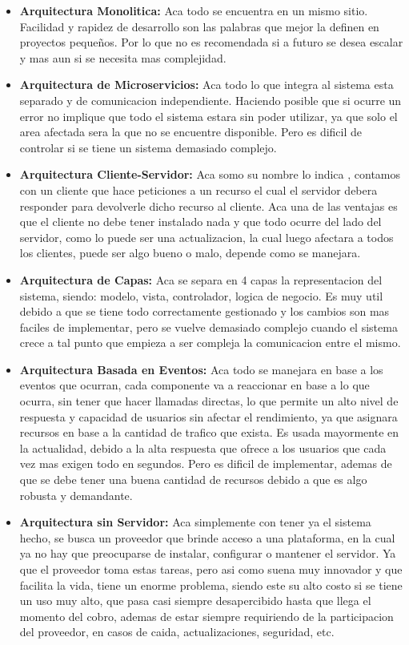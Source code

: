 \documentclass[12pt]{article}
\begin{document}
\begin{itemize}
    \item\textbf{Arquitectura Monolitica:} Aca todo se encuentra en un mismo sitio. Facilidad y rapidez de desarrollo son las palabras que mejor la definen en proyectos pequeños. Por lo que no es recomendada si a futuro se desea escalar y mas aun si se necesita mas complejidad.
    
    \item \textbf{Arquitectura de Microservicios:} Aca todo lo que integra al sistema esta separado y de comunicacion independiente. Haciendo posible que si ocurre un error no implique que todo el sistema estara sin poder utilizar, ya que solo el area afectada sera la que no se encuentre disponible. Pero es dificil de controlar si se tiene un sistema demasiado complejo.
    \item\textbf{Arquitectura Cliente-Servidor:} Aca somo su nombre lo indica , contamos con un cliente que hace peticiones a un recurso el cual el servidor debera responder para devolverle dicho recurso al cliente. Aca una de las ventajas es que el cliente no debe tener instalado nada y que todo ocurre del lado del servidor, como lo puede ser una actualizacion, la cual luego afectara a todos los clientes, puede ser algo bueno o malo, depende como se manejara.
    \item\textbf{Arquitectura de Capas:} Aca se separa en 4 capas la representacion del sistema, siendo: modelo, vista, controlador, logica de negocio. Es muy util debido a que se tiene todo correctamente gestionado y los cambios son mas faciles de implementar, pero se vuelve demasiado complejo cuando el sistema crece a tal punto que empieza a ser compleja la comunicacion entre el mismo.
    \item\textbf{Arquitectura Basada en Eventos:} Aca todo se manejara en base a los eventos que ocurran, cada componente va a reaccionar en base a lo que ocurra, sin tener que hacer llamadas directas, lo que permite un alto nivel de respuesta y capacidad de usuarios sin afectar el rendimiento, ya que asignara recursos en base a la cantidad de trafico que exista. Es usada mayormente en la actualidad, debido a la alta respuesta que ofrece a los usuarios que cada vez mas exigen todo en segundos. Pero es dificil de implementar, ademas de que se debe tener una buena cantidad de recursos debido a que es algo robusta y demandante.
    \item\textbf{Arquitectura sin Servidor:} Aca simplemente con tener ya el sistema hecho, se busca un proveedor que brinde acceso a una plataforma, en la cual ya no hay que preocuparse de instalar, configurar o mantener el servidor. Ya que el proveedor toma estas tareas, pero asi como suena muy innovador y que facilita la vida, tiene un enorme problema, siendo este su alto costo si se tiene un uso muy alto, que pasa casi siempre desapercibido hasta que llega el momento del cobro, ademas de estar siempre requiriendo de la participacion del proveedor, en casos de caida, actualizaciones, seguridad, etc.
\end{itemize}
\end{document}
